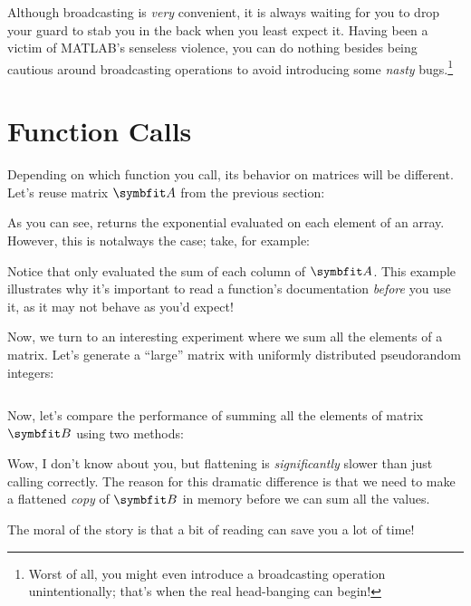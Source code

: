 \documentclass{article}
\begin{document}
Although broadcasting is \emph{very} convenient, it is always waiting
for you to drop your guard to stab you in the back when you least expect
it.  Having been a victim of MATLAB's senseless violence, you can do
nothing besides being cautious around broadcasting operations to avoid
introducing some \emph{nasty} bugs.\footnote{Worst of all, you might
even introduce a broadcasting operation unintentionally; that's when
the real head-banging can begin!}

\section{Function Calls}

Depending on which function you call, its behavior on matrices will be
different.  Let's reuse matrix \(\mat{A}\) from the previous section:


As you can see,  returns the exponential evaluated on each element of an
array. However, this is notalways the case; take, for example:


Notice that  only evaluated the sum of each column of \(\mat{A}\). This
example illustrates why it's important to read a function's
documentation \emph{before} you use it, as it may not behave as you'd
expect!

Now, we turn to an interesting experiment where we sum all the elements
of a matrix. Let's generate a \enquote{large} matrix with uniformly
distributed pseudorandom integers:

\inputminted{matlab}{02-vectorization.d/randi.m}

Now, let's compare the performance of summing all the elements of matrix
\(\mat{B}\) using two methods:



Wow, I don't know about you, but flattening is \emph{significantly}
slower than just calling  correctly.  The reason for this dramatic
difference is that we need to make a flattened \emph{copy} of
\(\mat{B}\) in memory before we can sum all the values.

The moral of the story is that a bit of reading can save you a lot of
time!
\end{document}
